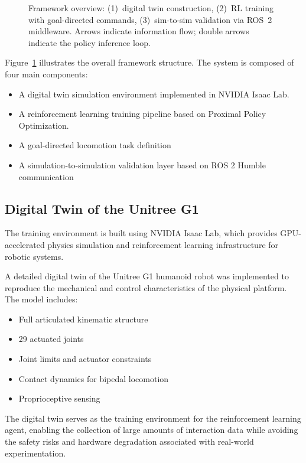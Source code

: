 \documentclass[pdflatex,sn-mathphys-num]{sn-jnl}%
\theoremstyle{thmstyleone}%
\theoremstyle{thmstyletwo}%
\theoremstyle{thmstylethree}%
\begin{document}
\begin{figure}[t]
\centering
\resizebox{\textwidth}{!}{}
\caption{Framework overview: (1)~digital twin construction, (2)~RL training with
goal-directed commands, (3)~sim-to-sim validation via ROS~2 middleware. Arrows
indicate information flow; double arrows indicate the policy inference loop.}
\label{fig:arch}
\end{figure}


Figure~\ref{fig:arch} illustrates the overall framework structure.
The system is composed of four main components:
\begin{itemize}
    \item A digital twin simulation environment implemented in NVIDIA Isaac Lab.
    \item A reinforcement learning training pipeline based on Proximal Policy Optimization.
    \item A goal-directed locomotion task definition
    \item A simulation-to-simulation validation layer based on ROS 2 Humble communication
\end{itemize}

\subsection{Digital Twin of the Unitree G1}
The training environment is built using NVIDIA Isaac Lab, which provides GPU-accelerated physics simulation and reinforcement learning infrastructure for robotic systems.

A detailed digital twin of the Unitree G1 humanoid robot was implemented to reproduce the mechanical and control characteristics of the physical platform. The model includes:

\begin{itemize}
    \item Full articulated kinematic structure
    \item 29 actuated joints
    \item Joint limits and actuator constraints
    \item Contact dynamics for bipedal locomotion
    \item Proprioceptive sensing
\end{itemize}

The digital twin serves as the training environment for the reinforcement learning agent, enabling the collection of large amounts of interaction data while avoiding the safety risks and hardware degradation associated with real-world experimentation.
\end{document}

